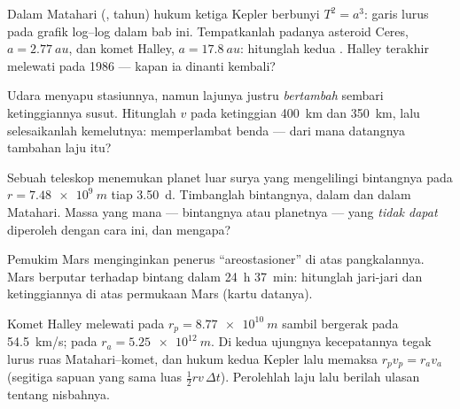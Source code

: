 \begin{exercise}[$\star\star$]\label{exo:g12:satellites-kepler:11}
Dalam  Matahari (, tahun) hukum ketiga Kepler berbunyi
$T^2 = a^3$: garis lurus pada grafik log--log dalam bab ini. Tempatkanlah
padanya asteroid Ceres, $a = \qty{2.77}{au}$, dan komet Halley,
$a = \qty{17.8}{au}$: hitunglah kedua . Halley terakhir melewati
 pada 1986 --- kapan ia dinanti kembali?
\end{exercise}

\begin{exercise}[$\star\star\star$]\label{exo:g12:satellites-kepler:12}
Udara  menyapu stasiunnya, namun lajunya justru \emph{bertambah} sembari
ketinggiannya susut. Hitunglah $v$ pada ketinggian \qty{400}{km} dan
\qty{350}{km}, lalu selesaikanlah kemelutnya:  memperlambat benda
--- dari mana datangnya tambahan laju itu?
\end{exercise}

\begin{exercise}[$\star\star\star$]\label{exo:g12:satellites-kepler:13}
Sebuah teleskop menemukan planet luar surya yang mengelilingi bintangnya pada
$r = \qty{7.48e9}{m}$ tiap \qty{3.50}{d}. Timbanglah bintangnya, dalam
 dan dalam  Matahari. Massa yang mana --- bintangnya atau
planetnya --- yang \emph{tidak dapat} diperoleh dengan cara ini, dan mengapa?
\end{exercise}

\begin{exercise}[$\star\star\star$]\label{exo:g12:satellites-kepler:14}
Pemukim Mars menginginkan penerus  ``areostasioner'' di atas
pangkalannya. Mars berputar terhadap bintang dalam \qty{24}{h} \qty{37}{min}:
hitunglah jari-jari  dan ketinggiannya di atas permukaan Mars
(kartu datanya).
\end{exercise}

\begin{exercise}[$\star\star\star$]\label{exo:g12:satellites-kepler:15}
Komet Halley melewati  pada $r_p = \qty{8.77e10}{m}$ sambil
bergerak pada \qty{54.5}{km/s};  pada $r_a = \qty{5.25e12}{m}$. Di
kedua ujungnya kecepatannya tegak lurus ruas Matahari--komet, dan hukum kedua
Kepler lalu memaksa $r_p v_p = r_a v_a$ (segitiga sapuan yang sama luas
$\tfrac12 r v\,\Delta t$). Perolehlah laju  lalu berilah ulasan
tentang nisbahnya.
\end{exercise}

